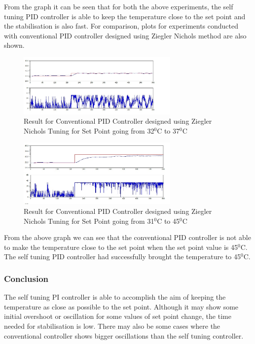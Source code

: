 From the graph it can be seen that for both the above experiments, the self tuning PID controller is able to keep the temperature close to the set point and the stabilisation is also fast. For comparison, plots for experiments conducted with conventional PID controller designed using Ziegler Nichols method are also shown.

\begin{figure}[h]
	\centering
\includegraphics[width=0.7\textwidth]{Vikas_self/report_tex/PID_results/Conventional_Tuning/Setpointchange/PID/step32to37.jpg}
	\caption{Result for Conventional PID Controller designed using Ziegler Nichols Tuning for Set Point going from 32$^0$C to 37$^0$C }
	\label{fig:step31to45}
\end{figure}


\begin{figure}[h]
	\centering
\includegraphics[width=0.7\textwidth]{Vikas_self/report_tex/PID_results/Conventional_Tuning/Setpointchange/PID/step31to45.jpg}
	\caption{Result for Conventional PID Controller designed using Ziegler Nichols Tuning for Set Point going from 31$^0$C to 45$^0$C }
	\label{fig:step31to45}
\end{figure}

From the above graph we can see that the conventional PID controller is not able to make the temperature close to the set point when the set point value is 45$^0$C. The self tuning PID controller had successfully brought the temperature to 45$^0$C.

\subsubsection{Conclusion}
The self tuning PI controller is able to accomplish the aim of keeping the temperature as close as possible to the set point. Although it may show some initial overshoot or oscillation for some values of set point change, the time needed for stabilisation is low. There may also be some cases where the conventional controller shows bigger oscillations than the self tuning controller.\\

